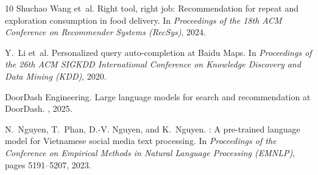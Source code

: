 \documentclass[acmsmall,screen]{acmart}
\begin{document}
\begin{thebibliography}{10}
Shuchao Wang et~al.
\newblock Right tool, right job: Recommendation for repeat and exploration
  consumption in food delivery.
\newblock In {\em Proceedings of the 18th ACM Conference on Recommender Systems
  (RecSys)}, 2024.

Y.~Li et~al.
\newblock Personalized query auto-completion at {Baidu Maps}.
\newblock In {\em Proceedings of the 26th ACM SIGKDD International Conference
  on Knowledge Discovery and Data Mining (KDD)}, 2020.

{DoorDash Engineering}.
\newblock Large language models for search and recommendation at {DoorDash}.
, 2025.

N.~Nguyen, T.~Phan, D.-V. Nguyen, and K.~Nguyen.
: A pre-trained language model for Vietnamese social media
  text processing.
\newblock In {\em Proceedings of the Conference on Empirical Methods in
  Natural Language Processing (EMNLP)}, pages 5191--5207, 2023.

\end{thebibliography}
\end{document}
